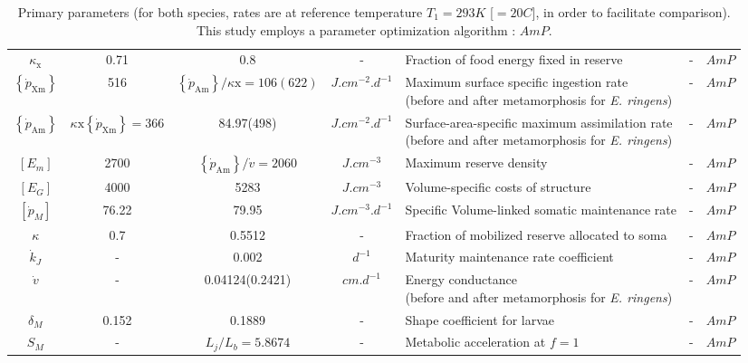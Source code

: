 \begin{table}[H]
\begin{adjustbox}{width=1.2\textwidth}
\begin{tabular}{c|c|c|c|l|c|c}
$\kappa_{\mathrm{x}} $						& 
0.71										& 
0.8											& 
-											& 
Fraction of food energy fixed in reserve	&
-											&
$AmP$										\\
$\left \{ \dot{p}_\mathrm{Xm} \right \}$								&
516																		& 
$\left \{ \dot{p}_\mathrm{Am} \right \}/\kappa \mathrm{x} = 106(622)$	& 
$J.cm^{-2}.d^{-1}$														& 
\makecell[l]{Maximum surface specific ingestion rate \\ (before and after metamorphosis for \textit{E. ringens})}																&
-																		&
$AmP$																	\\
$\left \{ \dot{p}_\mathrm{Am} \right \}$							& 
$ \kappa \mathrm{x} \left \{ \dot{p}_\mathrm{Xm} \right \}= 366$	&
84.97(498)															&
$J.cm^{-2}.d^{-1}$													&
\makecell[l]{Surface-area-specific maximum assimilation rate \\ (before and after metamorphosis for \textit{E. ringens})}												&
-																	& 
$AmP$																\\
$\left[ E_{m} \right]$									&
2700													&
$\left \{ \dot{p}_\mathrm{Am} \right \}/\dot{v}=2060$	&
$J.cm^{-3}$												&
Maximum reserve density									&
-														& 
$AmP$													\\
$\left[ E_{G} \right]$				&
4000								&
5283								&
$J.cm^{-3}$							& 
Volume-specific costs of structure &
-									&
$AmP$								\\
$\left [ \dot{p}_{M} \right ]$						& 
76.22												&
79.95												& 
$J.cm^{-3}.d^{-1}$									&
Specific Volume-linked somatic maintenance rate	&
-													&
$AmP$												\\
$\kappa$											&
0.7													& 
0.5512												& 
-													& 
Fraction of mobilized reserve allocated to soma	&
-													&
$AmP$												\\
$\dot{k}_{J}$							& 
-										& 
0.002									& 
$d^{-1}$								& 
Maturity maintenance rate coefficient	&
-										&
$AmP$									\\
$\dot{v}$																						& 
-																								& 
0.04124(0.2421)																					& 
$cm. d^{-1}$																					& 
\makecell[l]{Energy conductance \\ (before and after metamorphosis for \textit{E. ringens})}	&
-																								&
$AmP$																							\\
$\delta_{M}$					& 
0.152							& 
0.1889							& 
-								& 
Shape coefficient for larvae	& 
-								&
$AmP$							\\
$S_{M}$								& 
-									& 
$L_{j}/L_{b} = 5.8674$				& 
-									& 
Metabolic acceleration at $f = 1$	& 
-									&
$AmP$								\\
\end{tabular}
\end{adjustbox}
\caption{Primary parameters (for both species, rates are at reference temperature $T_{1} = 293 K$  [$=20$\textdegree $C$], in order to facilitate comparison). This study employs a parameter optimization algorithm : $AmP$.}
\label{param_compar}
\end{table}

